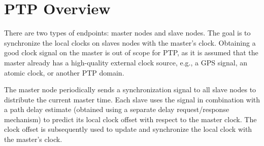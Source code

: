 \section{PTP Overview}
\label{sec:ptp-overview}
There are two types of endpoints: master nodes and slave nodes.
The goal is to synchronize the local clocks on slaves nodes with the master's
clock.
Obtaining a good clock signal on the master is out of scope for PTP,
as it is assumed that the master already has a high-quality external clock source,
e.g., a GPS signal, an atomic clock, or another PTP domain.

The master node periodically sends a synchronization signal to all slave nodes
to distribute the current master time.
Each slave uses the signal in combination with a path delay estimate
(obtained using a separate delay request/response mechanism)
to predict its local clock offset with respect to the master clock.
The clock offset is subsequently used to update and synchronize the local clock
with the master's clock.


